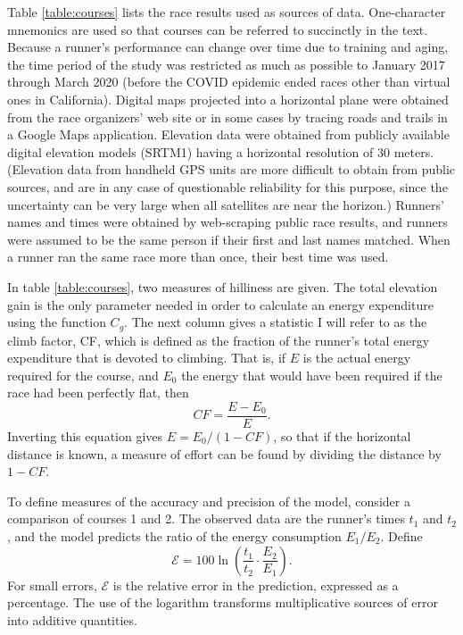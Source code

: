 \documentclass[10pt,letterpaper]{article}
\begin{document}
Table \ref{table:courses} lists the race results used as sources of data.
One-character mnemonics are used so that courses can be referred to succinctly in the text.
Because a runner's performance can change over time due to training and aging,
the time period of the study was restricted as much as possible to January 2017 through March 2020
(before the COVID epidemic ended races other than virtual ones in California).
Digital maps projected into a horizontal plane were obtained from the race organizers' web site
or in some cases by tracing roads and trails in a Google Maps application. Elevation data
were obtained from publicly available digital elevation models (SRTM1) having a horizontal
resolution of 30 meters. (Elevation data from handheld GPS units are more difficult to
obtain from public sources, and are in any case of questionable reliability
for this purpose, since the uncertainty can be very large when all satellites are near the
horizon.) Runners' names and times were obtained by web-scraping public race results,
and runners were assumed to be the same person if their first and last names matched.
When a runner ran the same race more than once, their best time was used.

In table \ref{table:courses}, two measures of hilliness are given. The total elevation gain
is the only parameter needed in order to calculate an energy expenditure using the function
$C_g$. The next column gives a statistic I will refer to as the climb factor, CF, which is
defined as the fraction of the runner's total energy expenditure that is devoted to climbing.
That is, if $E$ is the actual energy required for the course, and $E_0$ the energy that
would have been required if the race had been perfectly flat, then 
\begin{equation}
  CF=\frac{E-E_0}{E}.
\end{equation}
Inverting this equation gives $E=E_0/(1-CF)$, so that if the horizontal distance is
known, a measure of effort can be found by dividing the distance by $1-CF$.

To define measures of the accuracy and precision of the model, consider a comparison
of courses 1 and 2. The observed data are the runner's times $t_1$ and $t_2$, and
the model predicts the ratio of the energy consumption $E_1/E_2$. Define
\begin{equation}\label{eq:define-e}
  \mathcal{E} = 100 \ln\left(\frac{t_1}{t_2}\cdot\frac{E_2}{E_1}\right).
\end{equation}
For small errors, $\mathcal{E}$ is the relative error in the prediction, expressed
as a percentage. The use of the logarithm transforms multiplicative sources of
error into additive quantities.
\end{document}
